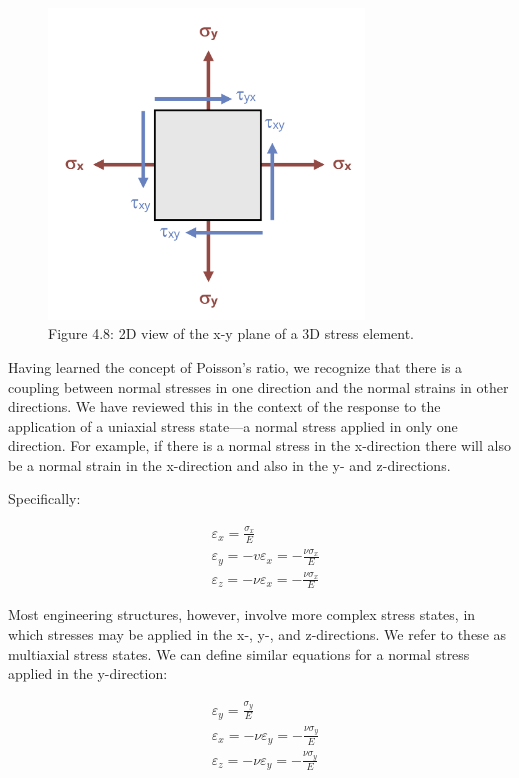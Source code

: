 \documentclass[
  letterpaper,
  DIV=11,
  numbers=noendperiod]{scrreprt}
\theoremstyle{definition}
\theoremstyle{remark}
\begin{document}
\begin{figure}[H]

{\centering \includegraphics[width=3.30208in,height=\textheight]{images/CH4 PNGs/4.8.png}

}

\caption{Figure 4.8: 2D view of the x-y plane of a 3D stress element.}

\end{figure}%

Having learned the concept of Poisson's ratio, we recognize that there
is a coupling between normal stresses in one direction and the normal
strains in other directions. We have reviewed this in the context of the
response to the application of a uniaxial stress state---a normal stress
applied in only one direction. For example, if there is a normal stress
in the x-direction there will also be a normal strain in the x-direction
and also in the y- and z-directions.

Specifically:

\[
\begin{aligned}
& \varepsilon_x=\frac{\sigma_x}{E} \\
& \varepsilon_y=-v \varepsilon_x=-\frac{\nu \sigma_x}{E} \\
& \varepsilon_z=-\nu \varepsilon_x=-\frac{\nu \sigma_x}{E}
\end{aligned}
\]

Most engineering structures, however, involve more complex stress
states, in which stresses may be applied in the x-, y-, and
z-directions. We refer to these as multiaxial stress states. We can
define similar equations for a normal stress applied in the y-direction:

\[
\begin{aligned}
& \varepsilon_y=\frac{\sigma_y}{E} \\
& \varepsilon_x=-\nu \varepsilon_y=-\frac{\nu \sigma_y}{E} \\
& \varepsilon_z=-\nu \varepsilon_y=-\frac{\nu \sigma_y}{E}
\end{aligned}
\]
\end{document}
